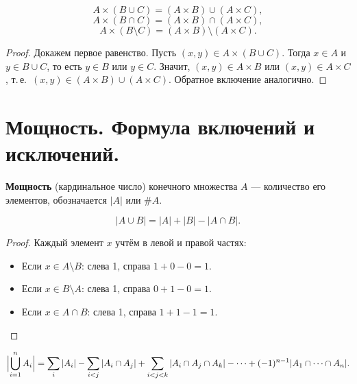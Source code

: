 \documentclass[12pt]{article}
\begin{document}
\begin{theorem}
\[
A \times (B \cup C) = (A \times B) \cup (A \times C),
\]
\[
A \times (B \cap C) = (A \times B) \cap (A \times C),
\]
\[
A \times (B \setminus C) = (A \times B) \setminus (A \times C).
\]
\end{theorem}

\begin{proof}
Докажем первое равенство. Пусть $(x,y) \in A \times (B \cup C)$.
Тогда $x \in A$ и $y \in B \cup C$, то есть $y \in B$ или $y \in C$.
Значит, $(x,y) \in A \times B$ или $(x,y) \in A \times C$,
т.\,е.\ $(x,y) \in (A\times B) \cup (A\times C)$.
Обратное включение аналогично.
\end{proof}

\section{Мощность. Формула включений и исключений.}

\begin{definition}
\textbf{Мощность} (кардинальное число) конечного множества $A$ ---
количество его элементов, обозначается $|A|$ или $\#A$.
\end{definition}

\begin{theorem}\label{thm:incl-excl-2}
\[
|A \cup B| = |A| + |B| - |A \cap B|.
\]
\end{theorem}

\begin{proof}
Каждый элемент $x$ учтём в левой и правой частях:
\begin{itemize}
\item Если $x \in A \setminus B$: слева 1, справа $1 + 0 - 0 = 1$.
\item Если $x \in B \setminus A$: слева 1, справа $0 + 1 - 0 = 1$.
\item Если $x \in A \cap B$: слева 1, справа $1 + 1 - 1 = 1$.
\end{itemize}
\end{proof}

\begin{theorem}
\[
\Bigl|\bigcup_{i=1}^n A_i\Bigr|
= \sum_{i}|A_i|
- \sum_{i<j}|A_i \cap A_j|
+ \sum_{i<j<k}|A_i \cap A_j \cap A_k|
- \cdots
+ (-1)^{n-1}|A_1 \cap \cdots \cap A_n|.
\]
\end{theorem}
\end{document}
